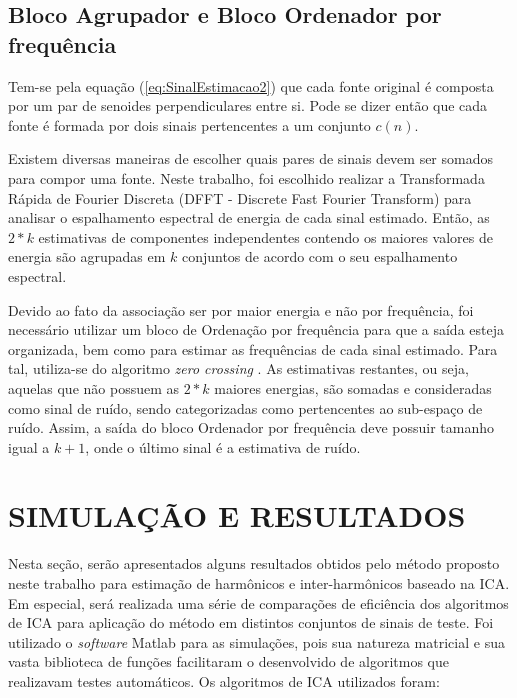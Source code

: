 \documentclass[a4paper,12pt]{monografia}
\theoremstyle{plain}
\theoremstyle{definition}
\theoremstyle{remark}
\begin{document}
\section{Bloco Agrupador e Bloco Ordenador por frequência}

Tem-se pela equação (\ref{eq:SinalEstimacao2}) que cada fonte original é composta por um par de senoides perpendiculares entre si. Pode se dizer então que cada fonte é formada por dois sinais pertencentes a um conjunto $c(n)$.

Existem diversas maneiras de escolher quais pares de sinais devem ser somados para compor uma fonte. Neste trabalho, foi escolhido realizar a Transformada Rápida de Fourier Discreta (DFFT - Discrete Fast Fourier Transform) para analisar o espalhamento espectral de energia de cada sinal estimado. Então, as $2*k$ estimativas de componentes independentes contendo os  maiores valores de energia são agrupadas em $k$ conjuntos de acordo com o seu espalhamento espectral. 

Devido ao fato da associação ser por maior energia e não por frequência, foi necessário utilizar um bloco de Ordenação por frequência para que a saída esteja organizada, bem como para estimar as frequências de cada sinal estimado. Para tal, utiliza-se do algoritmo \textit{zero crossing} \cite{hummel1984zero}. As estimativas restantes, ou seja, aquelas que não possuem as $2*k$ maiores energias, são somadas e consideradas como sinal de ruído, sendo categorizadas como pertencentes ao sub-espaço de ruído. Assim, a saída do bloco Ordenador por frequência deve possuir tamanho igual a $k+1$, onde o último sinal é a estimativa de ruído. 


\chapter{SIMULAÇÃO E RESULTADOS}
\label{ch:simres}

Nesta seção, serão apresentados alguns resultados obtidos pelo método proposto neste trabalho para estimação de harmônicos e inter-harmônicos baseado na ICA. Em especial, será realizada uma série de comparações de eficiência dos algoritmos de ICA para aplicação do método em distintos conjuntos de sinais de teste. Foi utilizado o \textit{software} Matlab para as simulações, pois sua natureza matricial e sua vasta biblioteca de funções facilitaram o desenvolvido de algoritmos que realizavam testes automáticos. Os algoritmos de ICA utilizados foram:
\end{document}
